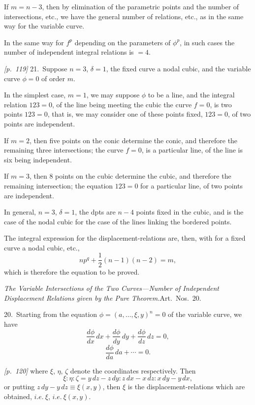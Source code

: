 \documentclass[11pt,a4paper]{article}
\theoremstyle{plain}
\theoremstyle{definition}
\theoremstyle{remark}
\begin{document}
If $m = n - 3$, then by elimination of the parametric points and the number of intersections, etc., we have the general number of relations, etc., as in the same way for the variable curve.

In the same way for $f^p$ depending on the parameters of $\phi^p$, in such cases the number of independent integral relations is $= 4$.

\bigskip\noindent\textit{[p.~119]} 21.\ Suppose $n = 3$, $\delta = 1$, the fixed curve a nodal cubic, and the variable curve $\phi = 0$ of order $m$.

In the simplest case, $m = 1$, we may suppose $\phi$ to be a line, and the integral relation $123 = 0$, of the line being meeting the cubic the curve $f = 0$, is two points $123 = 0$, that is, we may consider one of these points fixed, $123 = 0$, of two points are independent.

If $m = 2$, then five points on the conic determine the conic, and therefore the remaining three intersections; the curve $f = 0$, is a particular line, of the line is six being independent.

If $m = 3$, then 8 points on the cubic determine the cubic, and therefore the remaining intersection; the equation $123 = 0$ for a particular line, of two points are independent.

In general, $n = 3$, $\delta = 1$, the dpts are $n - 4$ points fixed in the cubic, and is the case of the nodal cubic for the case of the lines linking the bordered points.

The integral expression for the displacement-relations are, then, with for a fixed curve a nodal cubic, etc.,
\[
n p^q + \frac{1}{2}(n - 1)(n - 2) = m,
\]
which is therefore the equation to be proved.

\textit{The Variable Intersections of the Two Curves---Number of Independent Displacement Relations given by the Pure Theorem.}\quad Art.\ Nos.~20.

20.\ Starting from the equation $\phi = (a, \ldots, \xi, y)^n = 0$ of the variable curve, we have
\[
\frac{d\phi}{dx}\,dx + \frac{d\phi}{dy}\,dy + \frac{d\phi}{dz}\,dz = 0,
\]
\[
\frac{d\phi}{da}\,da + \cdots = 0.
\]

\bigskip\noindent\textit{[p.~120]} where $\xi$, $\eta$, $\zeta$ denote the coordinates respectively. Then
\[
\xi : \eta : \zeta = y\,dz - z\,dy : z\,dx - x\,dz : x\,dy - y\,dx,
\]
or putting $z\,dy - y\,dz \equiv \xi(x, y)$, then $\xi$ is the displacement-relations which are obtained, $i.e.\ \xi$, $i.e.\ \xi(x, y)$.
\end{document}
